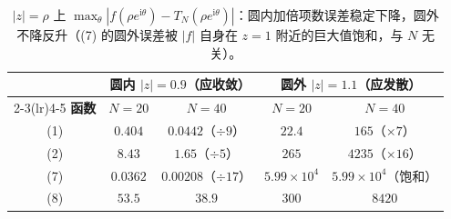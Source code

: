 \documentclass[11pt,a4paper]{ctexart}
\theoremstyle{definition}
\newcommand{\ii}{\mathrm{i}}
\begin{document}
\begin{table}[H]
\centering
\small
\setlength{\tabcolsep}{6pt}
\renewcommand{\arraystretch}{1.2}
\begin{tabular}{@{}c c c c c@{}}
\toprule
& \multicolumn{2}{c}{\textbf{圆内 $|z|=0.9$（应收敛）}} & \multicolumn{2}{c}{\textbf{圆外 $|z|=1.1$（应发散）}}\\
\cmidrule(lr){2-3}\cmidrule(lr){4-5}
\textbf{函数} & $N=20$ & $N=40$ & $N=20$ & $N=40$\\
\midrule
(1) & $0.404$ & $0.0442$（$\div9$） & $22.4$ & $165$（$\times7$）\\
(2) & $8.43$ & $1.65$（$\div5$） & $265$ & $4235$（$\times16$）\\
(7) & $0.0362$ & $0.00208$（$\div17$） & $5.99\times10^4$ & $5.99\times10^4$（饱和）\\
(8) & $53.5$ & $38.9$ & $300$ & $8420$\\
\bottomrule
\end{tabular}
\caption{$|z|=\rho$ 上 $\max_\theta|f(\rho e^{\ii\theta})-T_N(\rho e^{\ii\theta})|$：圆内加倍项数误差稳定下降，圆外不降反升（(7) 的圆外误差被 $|f|$ 自身在 $z=1$ 附近的巨大值饱和，与 $N$ 无关）。}
\end{table}
\end{document}
